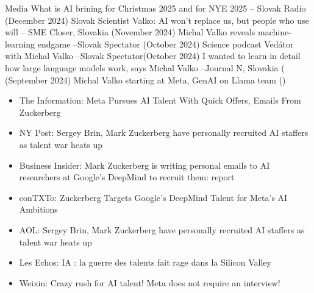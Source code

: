 \documentclass{resume}
\begin{document}
\begin{category}{Media}
\citembullet What is AI brining for Christmas 2025 and for NYE 2025 -- Slovak Radio ({\sf December 2024}) 
\citembullet Slovak Scientist Valko: AI won't replace us, but people who use will -- SME Closer, Slovakia ({\sf November 2024}) 
\citembullet Michal Valko reveals machine-learning endgame --Slovak Spectator  ({\sf October 2024}) 
\citembullet Science podcast Vedátor with Michal Valko --Slovak Spectator({\sf October 2024}) 
\citembullet I wanted to learn in detail how large language models work, says Michal Valko --Journal N, Slovakia ( ({\sf September 2024}) 
\citembullet
Michal Valko starting at Meta, GenAI on Llama team  ({}) 
\begin{itemize}
\item  The Information: Meta Pursues AI Talent With Quick Offers, Emails From Zuckerberg
\item  NY Post: Sergey Brin, Mark Zuckerberg have personally recruited AI staffers as talent war heats up
\item  Business Insider: Mark Zuckerberg is writing personal emails to AI researchers at Google's DeepMind to recruit them: report
\item  conTXTo: Zuckerberg Targets Google’s DeepMind Talent for Meta’s AI Ambitions
\item AOL: Sergey Brin, Mark Zuckerberg have personally recruited AI staffers as talent war heats up
\item  Les Echos: IA : la guerre des talents fait rage dans la Silicon Valley
\item Weixin:  Crazy rush for AI talent! Meta does not require an interview!
\end{itemize}


\end{category}
\end{document}
